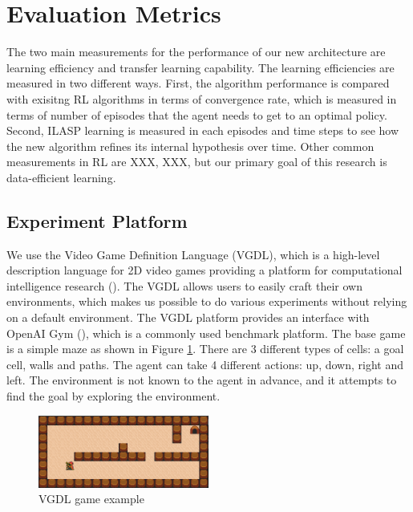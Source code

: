 \section{Evaluation Metrics}

The two main measurements for the performance of our new architecture are learning efficiency and transfer learning capability.
The learning efficiencies are measured in two different ways. First, the algorithm performance is compared with exisitng RL algorithms in terms of
convergence rate, which is measured in terms of number of episodes that the agent needs to get to an optimal policy.
Second, ILASP learning is measured in each episodes and time steps to see how the new algorithm refines its internal hypothesis over time.
Other common measurements in RL are XXX, XXX, but our primary goal of this research is data-efficient learning.

\subsection{Experiment Platform}
We use the Video Game Definition Language (VGDL), which is a high-level description language for 2D video games providing a platform for computational intelligence research (\cite{Schaul2013}).
The VGDL allows users to easily craft their own environments, which makes us possible to do various experiments without relying on a default environment. The VGDL platform provides an interface with OpenAI Gym (\cite{Brockman2016}), which is a commonly used benchmark platform. 
The base game is a simple maze as shown in Figure \ref{VGDL_sample}.
There are 3 different types of cells: a goal cell, walls and paths. The agent can take 4 different actions: up, down, right and left.
The environment is not known to the agent in advance, and it attempts to find the goal by exploring the environment.

\begin{figure}[!ht!b]
    \centering
    \includegraphics[width=0.5\textwidth]{./figures/experiment1}
    \caption{VGDL game example}
    \label{VGDL_sample}
    \end{figure}    
